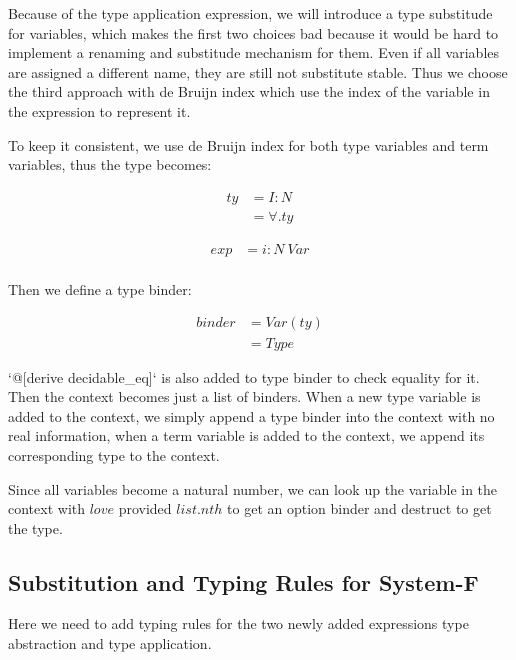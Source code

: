 \documentclass[conference]{IEEEtran}
\begin{document}
Because of the type application expression, we will introduce a type substitude for
variables, which makes the first two choices bad because it would be hard to implement
a renaming and substitude mechanism for them. Even if all variables are assigned
a different name, they are still not substitute stable.
Thus we choose the third approach with
de Bruijn index which use the index of the variable in the expression to represent it.

To keep it consistent, we use de Bruijn index for both type variables and term variables,
thus the type becomes:

\begin{equation} \label{FTyI}
	\begin{split}
		ty & = I : N \\
		& = \forall .ty
	\end{split}
\end{equation}

\begin{equation} \label{FExpI}
	\begin{split}
		exp & = i : N\ Var \\
	\end{split}
\end{equation}

Then we define a type binder:

\begin{equation} \label{FBinder}
	\begin{split}
		binder & = Var(ty)\\
		& = Type
	\end{split}
\end{equation}

`@[derive decidable\_eq]` is also added to type binder to check equality for it.
Then the context becomes just a list of binders. When a new type variable is added
to the context, we simply append a type binder into the context with no real information,
when a term variable is added to the context, we append its corresponding type to
the context.

Since all variables become a natural number, we can look up the variable in the context
with $love$ provided $list.nth$ to get an option binder and destruct to get the type.

\subsection{Substitution and Typing Rules for System-F}
Here we need to add typing rules for the two newly added expressions type abstraction
and type application.
\end{document}
